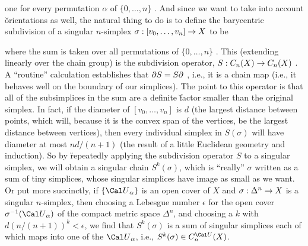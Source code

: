 
one for every permutation $\alpha$ of $\{0,\ldots ,n\}$ . And since we want to take into account
\u{orientations} as well, the natural thing to do is to define the barycentric subdivision of a singular
$n$-simplex $\sigma:[v_0,\ldots ,v_n]\rightarrow X$ to be


where the sum is taken over all permutations of $\{0,\ldots ,n\}$ .
This (extending linearly over the chain group) is the subdivision operator, $S:C_n(X)\rightarrow C_n(X)$ . 
A ``routine'' calculation establishes that $\partial S = S\partial$ , i.e., it is a chain map
(i.e., it behaves well on the boundary of our simplices). The point to this operator is that all of the 
subsimplices in the sum are a definite \u{factor} smaller than the original simplex. In fact,
if the diameter of $[v_0,\ldots ,v_n]$ is $d$ (the largest distance between points, which will,
because it is the convex span of the vertices, be the largest distance between vertices), then
every individual simplex in $S(\sigma)$ will have diameter at most $nd/(n+1)$ (the result of a little
Euclidean geometry and induction). So by \u{repeatedly} applying the subdivision operator
$S$ to a singular simplex, we will obtain a singular chain $S^k(\sigma)$,
which is ``really'' $\sigma$ written as a sum of tiny simplices, whose singular simplices 
have image as small as we want. Or put more succinctly, if $\{{\Cal U}_\alpha\}$ is an open cover of $X$
and $\sigma:\Delta^n\rightarrow X$ is a singular $n$-simplex, then choosing a Lebesgue number $\epsilon$ for
the open cover $\sigma^{-1}({\Cal U}_\alpha)$ of the compact metric space $\Delta^n$, and choosing 
a $k$ with $d(n/(n+1))^k<\epsilon$, we find that $S^k(\sigma)$ is a sum of singular simplices
each of which maps into one of the ${\Cal U}_\alpha$, i.e., $S^k(\sigma)\in C_n^{\Cal U}(X)$.

\msk

